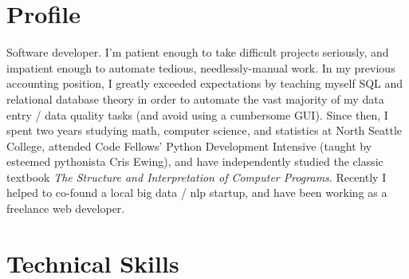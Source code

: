 \documentclass[10pt,a4paper,sans]{moderncv}        %
\begin{document}
\makecvtitle

\section{Profile}
Software developer. I'm patient enough to take difficult projects seriously, and
impatient enough to automate tedious, needlessly-manual work. In my previous
accounting position, I greatly exceeded expectations by teaching myself SQL and
relational database theory in order to automate the vast majority of my data
entry / data quality tasks (and avoid using a cumbersome GUI). Since then, I
spent two years studying math, computer science, and statistics at North Seattle
College, attended Code Fellows' Python Development Intensive (taught by esteemed
pythonista Cris Ewing), and have independently studied the classic textbook
\textit{The Structure and Interpretation of Computer Programs}. Recently I
helped to co-found a local big data / nlp startup, and have been working as a
freelance web developer.

\section{Technical Skills}
\begin{cvcolumns}
\end{cvcolumns}

\begin{comment}
  \section{Technical Skills}
  \subsection{Proficient}
  Python, Django, Django REST Framework, Pyramid, Git, SQL, HTML/CSS,
  JavaScript/jQuery, Unix systems, Shell Scripting, Org-mode, Regular Expressions
  \subsection{Familiar}
  AWS Deployment, Heroku Deployment, Ansible, PostgreSQL, Nginx, Gunicorn, Scheme, Sed
\end{comment}
\end{document}

